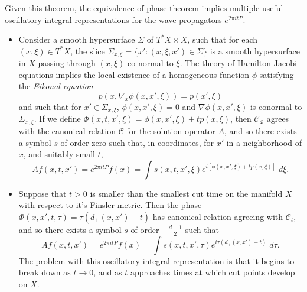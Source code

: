 Given this theorem, the equivalence of phase theorem implies multiple useful oscillatory integral representations for the wave propagators $e^{2 \pi i t P}$.
\begin{itemize}
  \item Consider a smooth hypersurface $\Sigma$ of $T^* X \times X$, such that for each $(x,\xi) \in T^* X$, the slice $\Sigma_{x,\xi} = \{ x' : (x,\xi,x') \in \Sigma \}$ is a smooth hypersurface in $X$ passing through $(x,\xi)$ co-normal to $\xi$. The theory of Hamilton-Jacobi equations implies the local existence of a homogeneous function $\phi$ satisfying the \emph{Eikonal equation}
  \begin{equation} \label{awiodjawoidhjioq23412341234234}
    p(x, \nabla_x \phi(x,x',\xi)) = p(x',\xi)
  \end{equation}
  and such that for $x' \in \Sigma_{x,\xi}$, $\phi(x,x',\xi) = 0$ and $\nabla \phi(x,x',\xi)$ is conormal to $\Sigma_{x,\xi}$. If we define $\Phi(x,t,x',\xi) = \phi(x,x',\xi) + t p(x,\xi)$, then $\mathcal{C}_\Phi$ agrees with the canonical relation $\mathcal{C}$ for the solution operator $A$, and so there exists a symbol $s$ of order zero such that, in coordinates, for $x'$ in a neighborhood of $x$, and suitably small $t$,
  \begin{equation} Af(x,t,x') = e^{2 \pi i t P}f(x) = \int s(x,t,x',\xi) e^{i [ \phi(x,x',\xi) + t p(x,\xi) ]}\; d \xi. \end{equation}

  \item Suppose that $t > 0$ is smaller than the smallest cut time on the manifold $X$ with respect to it's Finsler metric. Then the phase $\Phi(x,x',t,\tau) = \tau( d_+(x,x') - t)$ has canonical relation agreeing with $\mathcal{C}_t$, and so there exists a symbol $s$ of order $- \tfrac{d-1}{2}$ such that
  \begin{equation}
    Af(x,t,x') = e^{2 \pi i t P} f(x) = \int s(x,t,x',\tau) e^{i \tau( d_+(x,x') - t )}\; d\tau.
  \end{equation}
  The problem with this oscillatory integral representation is that it begins to break down as $t \to 0$, and as $t$ approaches times at which cut points develop on $X$.


\end{itemize}
